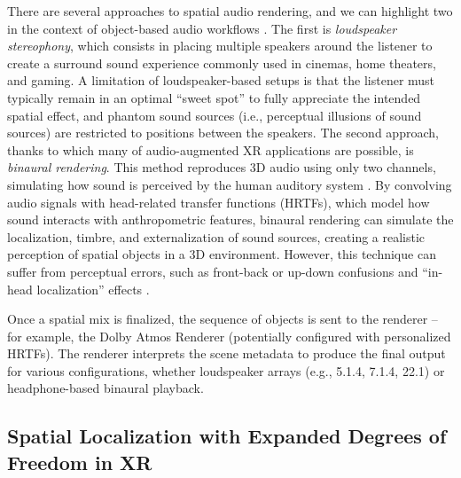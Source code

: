 There are several approaches to spatial audio rendering, and we can highlight two in the context of object-based audio workflows \cite{sinclair2020principles}. The first is \emph{loudspeaker stereophony}, which consists in placing multiple speakers around the listener to create a surround sound experience commonly used in cinemas, home theaters, and gaming. A limitation of loudspeaker-based setups is that the listener must typically remain in an optimal \enquote{sweet spot} to fully appreciate the intended spatial effect, and phantom sound sources (i.e., perceptual illusions of sound sources) are restricted to positions between the speakers. The second approach, thanks to which many of audio-augmented XR applications are possible, is \emph{binaural rendering}. This method reproduces 3D audio using only two channels, simulating how sound is perceived by the human auditory system \cite{jens1996binaural, mauro2013binaural}. By convolving audio signals with head-related transfer functions (HRTFs), which model how sound interacts with anthropometric features, binaural rendering can simulate the localization, timbre, and externalization of sound sources, creating a realistic perception of spatial objects in a 3D environment.
However, this technique can suffer from perceptual errors, such as front-back or up-down confusions and \enquote{in-head localization} effects \cite{yang2022audio}. 

Once a spatial mix is finalized, the sequence of objects is sent to the renderer -- for example, the Dolby Atmos Renderer (potentially configured with personalized HRTFs). The renderer interprets the scene metadata to produce the final output for various configurations, whether loudspeaker arrays (e.g., 5.1.4, 7.1.4, 22.1) or headphone-based binaural playback. 

\subsection{Spatial Localization with Expanded Degrees of Freedom in XR}

